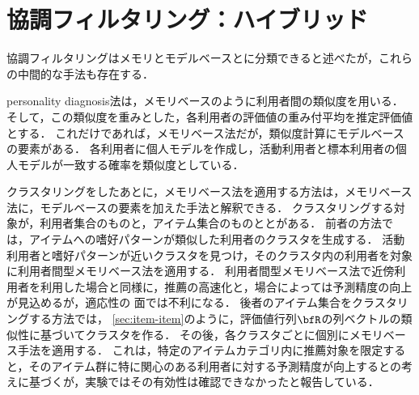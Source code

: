 \chapter{協調フィルタリング：ハイブリッド}
\label{sec:cfsummary}

協調フィルタリングはメモリとモデルベースとに分類できると述べたが，これらの中間的な手法も存在する．

personality diagnosis法\cite{uai:00:01}は，メモリベースのように利用者間の類似度を用いる．
そして，この類似度を重みとした，各利用者の評価値の重み付平均を推定評価値とする．
これだけであれば，メモリベース法だが，類似度計算にモデルベースの要素がある．
各利用者に個人モデルを作成し，活動利用者と標本利用者の個人モデルが一致する確率を類似度としている．

クラスタリングをしたあとに，メモリベース法を適用する方法は，メモリベース法に，モデルベースの要素を加えた手法と解釈できる．
クラスタリングする対象が，利用者集合のもの\cite{sigir:05:01}と，アイテム集合のものと\cite{misc:090}とがある．
前者の方法では，アイテムへの嗜好パターンが類似した利用者のクラスタを生成する．
活動利用者と嗜好パターンが近いクラスタを見つけ，そのクラスタ内の利用者を対象に利用者間型メモリベース法を適用する．
利用者間型メモリベース法で近傍利用者を利用した場合と同様に，推薦の高速化と，場合によっては予測精度の向上が見込めるが，適応性の
面では不利になる．
後者のアイテム集合をクラスタリングする方法では，
\ref{sec:item-item}のように，評価値行列$\bfR$の列ベクトルの類似性に基づいてクラスタを作る．
その後，各クラスタごとに個別にメモリベース手法を適用する．
これは，特定のアイテムカテゴリ内に推薦対象を限定すると，そのアイテム群に特に関心のある利用者に対する予測精度が向上するとの考えに基づくが，実験ではその有効性は確認できなかったと報告している．

